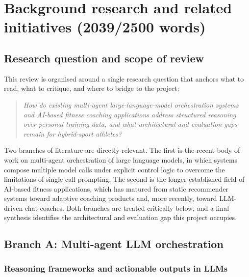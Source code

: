 
\chapter{Background research and related initiatives (2039/2500 words)}
\label{ch:lit-review}

\section{Research question and scope of review}

This review is organised around a single research question that anchors what to read, what to critique, and where to bridge to the project:

\begin{quote}
\textit{How do existing multi-agent large-language-model orchestration systems and AI-based fitness coaching applications address structured reasoning over personal training data, and what architectural and evaluation gaps remain for hybrid-sport athletes?}
\end{quote}

Two branches of literature are directly relevant. The first is the recent body of work on multi-agent orchestration of large language models, in which systems compose multiple model calls under explicit control logic to overcome the limitations of single-call prompting. The second is the longer-established field of AI-based fitness applications, which has matured from static recommender systems toward adaptive coaching products and, more recently, toward LLM-driven chat coaches. Both branches are treated critically below, and a final synthesis identifies the architectural and evaluation gap this project occupies.

\section{Branch A: Multi-agent LLM orchestration}

\subsection{Reasoning frameworks and actionable outputs in LLMs}

